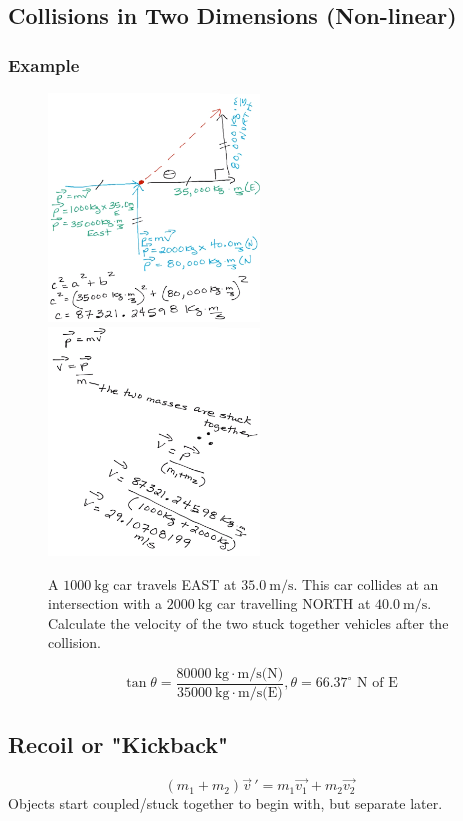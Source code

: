 \documentclass[a4paper,12pt]{article}
\begin{document}
\subsection{Collisions in Two Dimensions (Non-linear)}
\subsubsection{Example}
\begin{figure}[H]
    \centering
    \caption{A $\SI{1000}{\kg}$ car travels EAST at $\SI{35.0}{\m/\s}$. This car collides at an intersection with a $\SI{2000}{\kg}$ car travelling NORTH at $\SI{40.0}{\m/\s}$. Calculate the velocity of the two stuck together vehicles after the collision.}
    \includegraphics[width=0.50\textwidth]{q-2dcol}
    \includegraphics[width=0.50\textwidth]{q-2dcol-b}
\end{figure}
$$\tan{\theta} = \frac{ \SI{80000}{\kg\cdot\m/\s}\textrm{(N)} }{ \SI{35000}{\kg\cdot\m/\s}\textrm{(E)} }, \theta = 66.37^\circ \textrm{ N of E}$$

\subsection{Recoil or "Kickback"}
\Large $$(m_1 + m_2)\vec{v}\,' = m_1\vec{v_1} + m_2\vec{v_2}$$ \normalsize
Objects start coupled/stuck together to begin with, but separate later.
\end{document}
